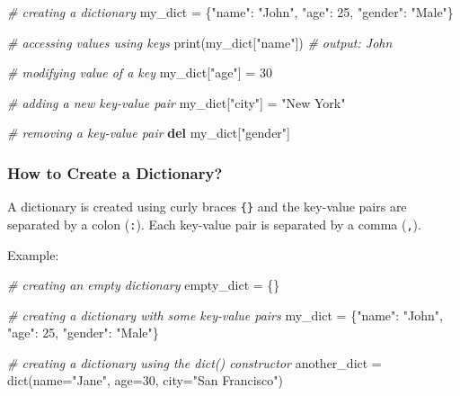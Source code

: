 \documentclass[11pt]{article}
\newenvironment{Shaded}{}{}
\newcommand{\KeywordTok}[1]{\textcolor[rgb]{0.00,0.44,0.13}{\textbf{{#1}}}}
\newcommand{\DecValTok}[1]{\textcolor[rgb]{0.25,0.63,0.44}{{#1}}}
\newcommand{\StringTok}[1]{\textcolor[rgb]{0.25,0.44,0.63}{{#1}}}
\newcommand{\CommentTok}[1]{\textcolor[rgb]{0.38,0.63,0.69}{\textit{{#1}}}}
\newcommand{\NormalTok}[1]{{#1}}
\newcommand{\OperatorTok}[1]{\textcolor[rgb]{0.40,0.40,0.40}{{#1}}}
\newcommand{\BuiltInTok}[1]{{#1}}
\begin{document}
\begin{Shaded}
\begin{Highlighting}[]
\CommentTok{\# creating a dictionary}
\NormalTok{my\_dict }\OperatorTok{=}\NormalTok{ \{}\StringTok{"name"}\NormalTok{: }\StringTok{"John"}\NormalTok{, }\StringTok{"age"}\NormalTok{: }\DecValTok{25}\NormalTok{, }\StringTok{"gender"}\NormalTok{: }\StringTok{"Male"}\NormalTok{\}}

\CommentTok{\# accessing values using keys}
\BuiltInTok{print}\NormalTok{(my\_dict[}\StringTok{"name"}\NormalTok{])  }\CommentTok{\# output: John}

\CommentTok{\# modifying value of a key}
\NormalTok{my\_dict[}\StringTok{"age"}\NormalTok{] }\OperatorTok{=} \DecValTok{30}

\CommentTok{\# adding a new key{-}value pair}
\NormalTok{my\_dict[}\StringTok{"city"}\NormalTok{] }\OperatorTok{=} \StringTok{"New York"}

\CommentTok{\# removing a key{-}value pair}
\KeywordTok{del}\NormalTok{ my\_dict[}\StringTok{"gender"}\NormalTok{]}
\end{Highlighting}
\end{Shaded}

\hypertarget{how-to-create-a-dictionary}{%
\subsubsection{How to Create a
Dictionary?}\label{how-to-create-a-dictionary}}

A dictionary is created using curly braces \texttt{\{\}} and the
key-value pairs are separated by a colon (\texttt{:}). Each key-value
pair is separated by a comma (\texttt{,}).

Example:

\begin{Shaded}
\begin{Highlighting}[]
\CommentTok{\# creating an empty dictionary}
\NormalTok{empty\_dict }\OperatorTok{=}\NormalTok{ \{\}}

\CommentTok{\# creating a dictionary with some key{-}value pairs}
\NormalTok{my\_dict }\OperatorTok{=}\NormalTok{ \{}\StringTok{"name"}\NormalTok{: }\StringTok{"John"}\NormalTok{, }\StringTok{"age"}\NormalTok{: }\DecValTok{25}\NormalTok{, }\StringTok{"gender"}\NormalTok{: }\StringTok{"Male"}\NormalTok{\}}

\CommentTok{\# creating a dictionary using the dict() constructor}
\NormalTok{another\_dict }\OperatorTok{=} \BuiltInTok{dict}\NormalTok{(name}\OperatorTok{=}\StringTok{"Jane"}\NormalTok{, age}\OperatorTok{=}\DecValTok{30}\NormalTok{, city}\OperatorTok{=}\StringTok{"San Francisco"}\NormalTok{)}
\end{Highlighting}
\end{Shaded}
\end{document}
